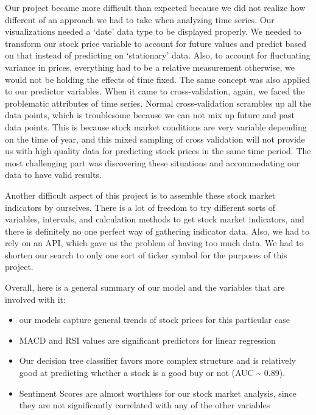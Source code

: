 \documentclass[
]{article}
\begin{document}
Our project became more difficult than expected because we did not
realize how different of an approach we had to take when analyzing time
series. Our visualizations needed a `date' data type to be displayed
properly. We needed to transform our stock price variable to account for
future values and predict based on that instead of predicting on
`stationary' data. Also, to account for fluctuating variance in prices,
everything had to be a relative measurement otherwise, we would not be
holding the effects of time fixed. The same concept was also applied to
our predictor variables. When it came to cross-validation, again, we
faced the problematic attributes of time series. Normal cross-validation
scrambles up all the data points, which is troublesome because we can
not mix up future and past data points. This is because stock market
conditions are very variable depending on the time of year, and this
mixed sampling of cross validation will not provide us with high quality
data for predicting stock prices in the same time period. The most
challenging part was discovering these situations and accommodating our
data to have valid results.

Another difficult aspect of this project is to assemble these stock
market indicators by ourselves. There is a lot of freedom to try
different sorts of variables, intervals, and calculation methods to get
stock market indicators, and there is definitely no one perfect way of
gathering indicator data. Also, we had to rely on an API, which gave us
the problem of having too much data. We had to shorten our search to
only one sort of ticker symbol for the purposes of this project.

Overall, here is a general summary of our model and the variables that
are involved with it:

\begin{itemize}
\item
  our models capture general trends of stock prices for this particular
  case
\item
  MACD and RSI values are significant predictors for linear regression
\item
  Our decision tree classifier favors more complex structure and is
  relatively good at predicting whether a stock is a good buy or not
  (AUC \textasciitilde{} 0.89).
\item
  Sentiment Scores are almost worthless for our stock market analysis,
  since they are not significantly correlated with any of the other
  variables
\end{itemize}
\end{document}
